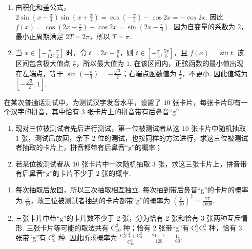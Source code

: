 \begin{solution}
\begin{enumerate}
\item 由积化和差公式，\(2\sin\left(x-\frac\pi4\right)\sin\left(x+\frac\pi4\right)=\cos\left(-\frac\pi2\right)-\cos2x=-\cos2x\). 因此 \(f(x)=\cos\left(2x-\frac\pi3\right)-\cos2x=\sin\left(2x-\frac\pi6\right)\). 因为自变量的系数为 \(2\)，最小正周期满足 \(2T=2\pi\)，所以 \(T=\pi\).
\item 当 \(x\in\left[-\frac\pi{12},\frac\pi2\right]\) 时，令 \(t=2x-\frac\pi6\)，则 \(t\in\left[-\frac\pi3,\frac{5\pi}6\right]\)，且 \(f(x)=\sin t\). 该区间包含极大值点 \(\frac\pi2\)，所以最大值为 \(1\). 在该区间内，正弦函数的最小值出现在左端点，等于 \(\sin\left(-\frac\pi3\right)=-\frac{\sqrt3}{2}\)；右端点函数值为 \(\frac12\)，不更小. 因此值域为 \(\left[-\frac{\sqrt3}{2},1\right]\).
\end{enumerate}
\end{solution}

\begin{problem}
在某次普通话测试中，为测试汉字发音水平，设置了 \(10\) 张卡片，每张卡片印有一个汉字的拼音，其中恰有 \(3\) 张卡片上的拼音带有后鼻音“\(\mathrm{g}\)”.

\begin{enumerate}
\item 现对三位被测试者先后进行测试，第一位被测试者从这 \(10\) 张卡片中随机抽取 \(1\) 张，测试后放回，余下 \(2\) 位的测试，也按同样的方法进行，求这三位被测试者抽取的卡片上，拼音都带有后鼻音“\(\mathrm{g}\)”的概率；
\item 若某位被测试者从 \(10\) 张卡片中一次随机抽取 \(3\) 张，求这三张卡片上，拼音带有后鼻音“\(\mathrm{g}\)”的卡片不少于 \(2\) 张的概率.
\end{enumerate}
\end{problem}

\begin{solution}
\begin{enumerate}
\item 每次抽取后放回，所以三次抽取相互独立. 每次抽到带后鼻音“g”的卡片的概率为 \(\frac3{10}\)，故三位被测试者抽到的卡片都带“g”的概率为 \(\left(\frac3{10}\right)^3=\frac{27}{1000}\).
\item 三张卡片中带“g”的卡片数不少于 \(2\) 张，分为恰有 \(2\) 张和恰有 \(3\) 张两种互斥情形. 三张卡片等可能的取法共有 \(\mathrm C_{10}^3\) 种；恰有 \(2\) 张带“g”有 \(\mathrm C_3^2\mathrm C_7^1\) 种，恰有 \(3\) 张带“g”有 \(\mathrm C_3^3\) 种. 因此所求概率为 \(\frac{\mathrm C_3^2\mathrm C_7^1+\mathrm C_3^3}{\mathrm C_{10}^3}=\frac{21+1}{120}=\frac{11}{60}\).
\end{enumerate}
\end{solution}

